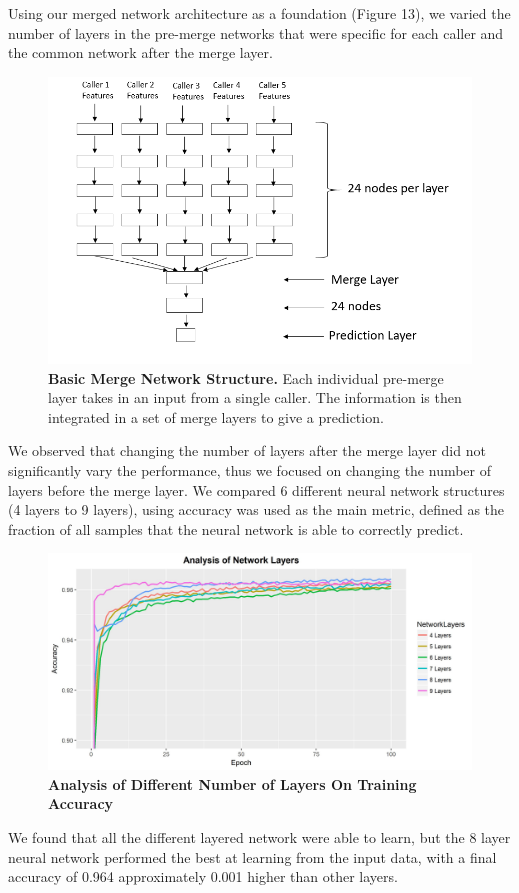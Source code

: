 \documentclass{article}
\begin{document}
Using our merged network architecture as a foundation (Figure 13), we varied the number of layers in the pre-merge networks that were specific for each caller and the common network after the merge layer.
\begin{figure}[H]
\includegraphics[width=\textwidth]{neuralnetworkarchitecturefinal.png}
\centering
\caption{\textbf{Basic Merge Network Structure.} Each individual pre-merge layer takes in an input from a single caller. The information is then integrated in a set of merge layers to give a prediction.}
\end{figure}
 We observed that changing the number of layers after the merge layer did not significantly vary the performance, thus we focused on changing the number of layers before the merge layer. We compared 6 different neural network structures (4 layers to 9 layers), using accuracy was used as the main metric, defined as the fraction of all samples that the neural network is able to correctly predict.
\begin{figure}[H]
\includegraphics[width=\textwidth]{networkstructuredataset.jpg}
\centering
\caption{\textbf{Analysis of Different Number of Layers On Training Accuracy}}
\end{figure}
We found that all the different layered network were able to learn, but the 8 layer neural network performed the best at learning from the input data, with a final accuracy of 0.964 approximately 0.001 higher than other layers.   
\end{document}
